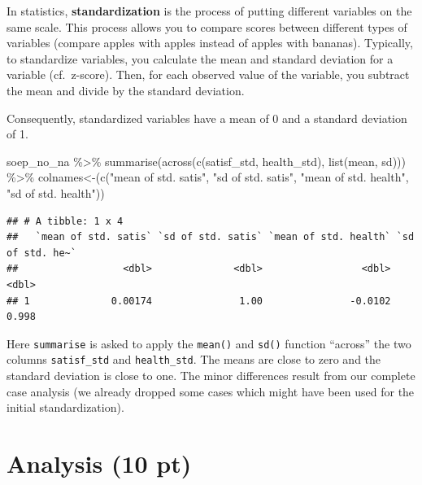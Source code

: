 \documentclass[
]{book}
\newenvironment{Shaded}{\begin{snugshade}}{\end{snugshade}}
\newcommand{\AttributeTok}[1]{\textcolor[rgb]{0.77,0.63,0.00}{#1}}
\newcommand{\FunctionTok}[1]{\textcolor[rgb]{0.00,0.00,0.00}{#1}}
\newcommand{\NormalTok}[1]{#1}
\newcommand{\SpecialCharTok}[1]{\textcolor[rgb]{0.00,0.00,0.00}{#1}}
\newcommand{\StringTok}[1]{\textcolor[rgb]{0.31,0.60,0.02}{#1}}
\begin{document}
In statistics, \textbf{standardization} is the process of putting different variables on the same scale. This process allows you to compare scores between different types of variables (compare apples with apples instead of apples with bananas). Typically, to standardize variables, you calculate the mean and standard deviation for a variable (cf.~z-score). Then, for each observed value of the variable, you subtract the mean and divide by the standard deviation.

Consequently, standardized variables have a mean of 0 and a standard deviation of 1.

\begin{Shaded}
\begin{Highlighting}[]
\NormalTok{soep\_no\_na }\SpecialCharTok{\%\textgreater{}\%}
  \FunctionTok{summarise}\NormalTok{(}\FunctionTok{across}\NormalTok{(}\FunctionTok{c}\NormalTok{(satisf\_std, health\_std), }\FunctionTok{list}\NormalTok{(mean, sd))) }\SpecialCharTok{\%\textgreater{}\%}
  \StringTok{\textasciigrave{}}\AttributeTok{colnames\textless{}{-}}\StringTok{\textasciigrave{}}\NormalTok{(}\FunctionTok{c}\NormalTok{(}\StringTok{"mean of std. satis"}\NormalTok{, }\StringTok{"sd of std. satis"}\NormalTok{, }
                 \StringTok{"mean of std. health"}\NormalTok{, }\StringTok{"sd of std. health"}\NormalTok{))}
\end{Highlighting}
\end{Shaded}

\begin{verbatim}
## # A tibble: 1 x 4
##   `mean of std. satis` `sd of std. satis` `mean of std. health` `sd of std. he~`
##                  <dbl>              <dbl>                 <dbl>            <dbl>
## 1              0.00174               1.00               -0.0102            0.998
\end{verbatim}

Here \texttt{summarise} is asked to apply the \texttt{mean()} and \texttt{sd()} function ``across'' the two columns \texttt{satisf\_std} and \texttt{health\_std}. The means are close to zero and the standard deviation is close to one. The minor differences result from our complete case analysis (we already dropped some cases which might have been used for the initial standardization).

\hypertarget{analysis-10-pt}{%
\section{Analysis (10 pt)}\label{analysis-10-pt}}
\end{document}

